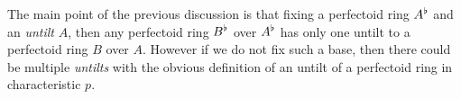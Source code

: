 The main point of the previous discussion is that fixing a perfectoid ring $A^{\flat}$ and an \emph{untilt} $A$, then any perfectoid ring $B^{\flat}$ over $A^{\flat}$ has only one untilt to a perfectoid ring $B$ over $A$. 
However if we do not fix such a base, then there could be
multiple \emph{untilts} with the obvious definition of an untilt of a perfectoid ring in characteristic $p$.












